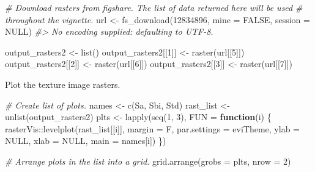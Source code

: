 \documentclass[
]{article}
\newenvironment{Shaded}{\begin{snugshade}}{\end{snugshade}}
\newcommand{\AttributeTok}[1]{\textcolor[rgb]{0.77,0.63,0.00}{#1}}
\newcommand{\CommentTok}[1]{\textcolor[rgb]{0.56,0.35,0.01}{\textit{#1}}}
\newcommand{\ConstantTok}[1]{\textcolor[rgb]{0.00,0.00,0.00}{#1}}
\newcommand{\ControlFlowTok}[1]{\textcolor[rgb]{0.13,0.29,0.53}{\textbf{#1}}}
\newcommand{\DecValTok}[1]{\textcolor[rgb]{0.00,0.00,0.81}{#1}}
\newcommand{\FunctionTok}[1]{\textcolor[rgb]{0.00,0.00,0.00}{#1}}
\newcommand{\NormalTok}[1]{#1}
\newcommand{\OtherTok}[1]{\textcolor[rgb]{0.56,0.35,0.01}{#1}}
\newcommand{\SpecialCharTok}[1]{\textcolor[rgb]{0.00,0.00,0.00}{#1}}
\newcommand{\StringTok}[1]{\textcolor[rgb]{0.31,0.60,0.02}{#1}}
\begin{document}
\begin{Shaded}
\begin{Highlighting}[]
\CommentTok{\# Download rasters from figshare. The list of data returned here will be used}
\CommentTok{\# throughout the vignette.}
\NormalTok{url }\OtherTok{\textless{}{-}} \FunctionTok{fs\_download}\NormalTok{(}\DecValTok{12834896}\NormalTok{, }\AttributeTok{mine =} \ConstantTok{FALSE}\NormalTok{, }\AttributeTok{session =} \ConstantTok{NULL}\NormalTok{)}
\CommentTok{\#\textgreater{} No encoding supplied: defaulting to UTF{-}8.}

\NormalTok{output\_rasters2 }\OtherTok{\textless{}{-}} \FunctionTok{list}\NormalTok{()}
\NormalTok{output\_rasters2[[}\DecValTok{1}\NormalTok{]] }\OtherTok{\textless{}{-}} \FunctionTok{raster}\NormalTok{(url[[}\DecValTok{5}\NormalTok{]])}
\NormalTok{output\_rasters2[[}\DecValTok{2}\NormalTok{]] }\OtherTok{\textless{}{-}} \FunctionTok{raster}\NormalTok{(url[[}\DecValTok{6}\NormalTok{]])}
\NormalTok{output\_rasters2[[}\DecValTok{3}\NormalTok{]] }\OtherTok{\textless{}{-}} \FunctionTok{raster}\NormalTok{(url[[}\DecValTok{7}\NormalTok{]])}
\end{Highlighting}
\end{Shaded}

Plot the texture image rasters.

\begin{Shaded}
\begin{Highlighting}[]
\CommentTok{\# Create list of plots.}
\NormalTok{names }\OtherTok{\textless{}{-}} \FunctionTok{c}\NormalTok{(}\StringTok{\textquotesingle{}Sa\textquotesingle{}}\NormalTok{, }\StringTok{\textquotesingle{}Sbi\textquotesingle{}}\NormalTok{, }\StringTok{\textquotesingle{}Std\textquotesingle{}}\NormalTok{)}
\NormalTok{rast\_list }\OtherTok{\textless{}{-}} \FunctionTok{unlist}\NormalTok{(output\_rasters2) }
\NormalTok{plts }\OtherTok{\textless{}{-}} \FunctionTok{lapply}\NormalTok{(}\FunctionTok{seq}\NormalTok{(}\DecValTok{1}\NormalTok{, }\DecValTok{3}\NormalTok{), }\AttributeTok{FUN =} \ControlFlowTok{function}\NormalTok{(i) \{}
\NormalTok{  rasterVis}\SpecialCharTok{::}\FunctionTok{levelplot}\NormalTok{(rast\_list[[i]], }\AttributeTok{margin =}\NormalTok{ F, }\AttributeTok{par.settings =}\NormalTok{ eviTheme, }
                       \AttributeTok{ylab =} \ConstantTok{NULL}\NormalTok{, }\AttributeTok{xlab =} \ConstantTok{NULL}\NormalTok{, }\AttributeTok{main =}\NormalTok{ names[i])}
\NormalTok{\})}

\CommentTok{\# Arrange plots in the list into a grid.}
\FunctionTok{grid.arrange}\NormalTok{(}\AttributeTok{grobs =}\NormalTok{ plts, }\AttributeTok{nrow =} \DecValTok{2}\NormalTok{)}
\end{Highlighting}
\end{Shaded}
\end{document}
